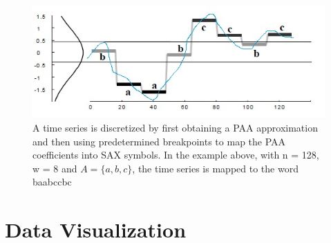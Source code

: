\begin{figure}[h!]
  \vspace{0.5em} %
  \includegraphics[scale=0.7]{Figures/SAX_transf.jpg}
  \caption{A time series is discretized by first obtaining a PAA approximation and then using predetermined breakpoints to map the PAA coefficients into SAX symbols. In the example above, with n = 128, w = 8 and $A = \{ a, b, c\}$, the time series is mapped to the word baabccbc }
  \label{SAX_transf}
\end{figure} 
 

\section{Data Visualization}

